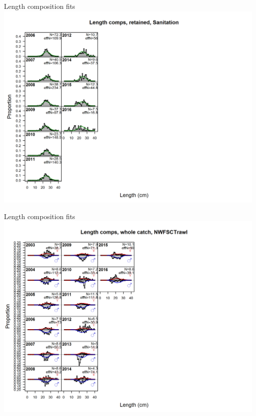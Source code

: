 \documentclass[ignorenonframetext,]{beamer}
\begin{document}
\begin{frame}{Length composition fits}\includegraphics{./r4ss/plots_mod1/comp_lenfit_flt7mkt2_page2.png}\end{frame}

\begin{frame}{Length composition fits}\includegraphics{./r4ss/plots_mod1/comp_lenfit_flt8mkt0.png}\end{frame}
\end{document}

